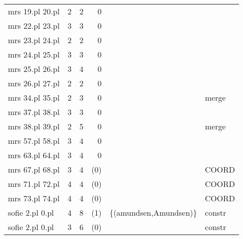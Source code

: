 \documentclass[11pt,a4paper,oneside,draft]{book}
\begin{document}
\begin{table}[htb]
\begin{center}
\begin{tabular}{lrrrll}
 mrs 19.pl 20.pl  &      2  &      2  &        0  &                                                &           \\
 mrs 22.pl 23.pl  &      3  &      3  &        0  &                                                &           \\
 mrs 23.pl 24.pl  &      2  &      2  &        0  &                                                &           \\
 mrs 24.pl 25.pl  &      3  &      3  &        0  &                                                &           \\
 mrs 25.pl 26.pl  &      3  &      4  &        0  &                                                &           \\
 mrs 26.pl 27.pl  &      2  &      2  &        0  &                                                &           \\
 mrs 34.pl 35.pl  &      2  &      3  &        0  &                                                &  merge    \\
 mrs 37.pl 38.pl  &      3  &      3  &        0  &                                                &           \\
 mrs 38.pl 39.pl  &      2  &      5  &        0  &                                                &  merge    \\
 mrs 57.pl 58.pl  &      3  &      4  &        0  &                                                &           \\
 mrs 63.pl 64.pl  &      3  &      4  &        0  &                                                &           \\
 mrs 67.pl 68.pl  &      3  &      4  &      (0)  &                                                &  COORD    \\
 mrs 71.pl 72.pl  &      4  &      4  &      (0)  &                                                &  COORD    \\
 mrs 73.pl 74.pl  &      4  &      4  &      (0)  &                                                &  COORD    \\
 sofie 2.pl 0.pl  &      4  &      8  &      (1)  &  \{(amundsen,Amundsen)\}                       &  constr   \\
 sofie 2.pl 0.pl  &      3  &      6  &      (0)  &                                                &  constr   \\
\end{tabular}
\end{center}
\end{table}
\end{document}
